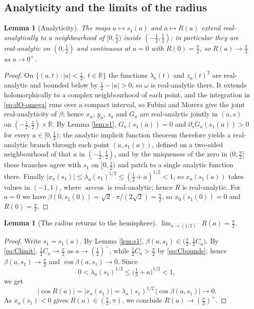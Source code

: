 \documentclass[11pt,a4paper]{amsart}
\theoremstyle{plain}
\newtheorem{lemma}[theorem]{Lemma}
\theoremstyle{definition}
\newcommand{\R}{\mathbb{R}}
\begin{document}
\subsection*{Analyticity and the limits of the radius}

\begin{lemma}[Analyticity]\label{lem:analytic}
The maps $a\mapsto s_1(a)$ and $a\mapsto R(a)$ extend real-analytically to a neighbourhood of $[0,\tfrac12)$ inside $(-\tfrac12,\tfrac12)$; in particular they are real-analytic on $(0,\tfrac12)$ and continuous at $a=0$ with $R(0)=\tfrac\pi2$, so $R(a)\to\tfrac\pi2$ as $a\to 0^+$.
\end{lemma}

\begin{proof}
On $\{(a,t):|a|<\tfrac12,\ t\in\R\}$ the functions $\lambda_a(t)$ and $z_a(t)^2$ are real-analytic and bounded below by $\tfrac12-|a|>0$, so $\omega$ is real-analytic there. It extends holomorphically to a complex neighbourhood of each point, and the integration in \eqref{eq:dO-omega} runs over a compact interval, so Fubini and Morera give the joint real-analyticity of $\beta$; hence $x_a$, $y_a$, $z_a$ and $G_a$ are real-analytic jointly in $(a,s)$ on $(-\tfrac12,\tfrac12)\times\R$. By Lemma \ref{lem:s1}, $G_a(s_1(a))=0$ and $\partial_sG_a(s_1(a))>0$ for every $a\in[0,\tfrac12)$; the analytic implicit function theorem therefore yields a real-analytic branch through each point $(a,s_1(a))$, defined on a two-sided neighbourhood of that $a$ in $(-\tfrac12,\tfrac12)$, and by the uniqueness of the zero in $(0,\tfrac\pi2]$ these branches agree with $s_1$ on $[0,\tfrac12)$ and patch to a single analytic function there. Finally $|x_a(s_1)|\leq\lambda_a(s_1)^{1/2}\leq(\tfrac12+a)^{1/2}<1$, so $x_a(s_1(a))$ takes values in $(-1,1)$, where $\arccos$ is real-analytic; hence $R$ is real-analytic. For $a=0$ we have $\beta(0,s_1(0))=\sqrt2\cdot\pi/(2\sqrt2)=\tfrac\pi2$, so $x_0(s_1(0))=0$ and $R(0)=\tfrac\pi2$.
\end{proof}

\begin{lemma}[The radius returns to the hemisphere]\label{lem:return}
$\displaystyle\lim_{a\to(1/2)^-}R(a)=\frac\pi2 .$
\end{lemma}

\begin{proof}
Write $s_1=s_1(a)$. By Lemma \ref{lem:s1}, $\beta(a,s_1)\in\bigl(\tfrac\pi2,\tfrac12C_a\bigr)$. By \eqref{eq:Climit}, $\tfrac12C_a\to\tfrac\pi2$ as $a\to(\tfrac12)^-$, while $\tfrac12 C_a>\tfrac\pi2$ by \eqref{eq:Cbounds}; hence $\beta(a,s_1)\to\tfrac\pi2$ and $\cos\beta(a,s_1)\to 0$. Since
\[
0<\lambda_a(s_1)^{1/2}\leq\bigl(\tfrac12+a\bigr)^{1/2}<1,
\]
we get
\[
\bigl|\cos R(a)\bigr|=\bigl|x_a(s_1)\bigr|=\lambda_a(s_1)^{1/2}\,\bigl|\cos\beta(a,s_1)\bigr|\longrightarrow 0 .
\]
As $x_a(s_1)<0$ gives $R(a)\in(\tfrac\pi2,\pi)$, we conclude $R(a)\to(\tfrac\pi2)^+$.
\end{proof}
\end{document}
